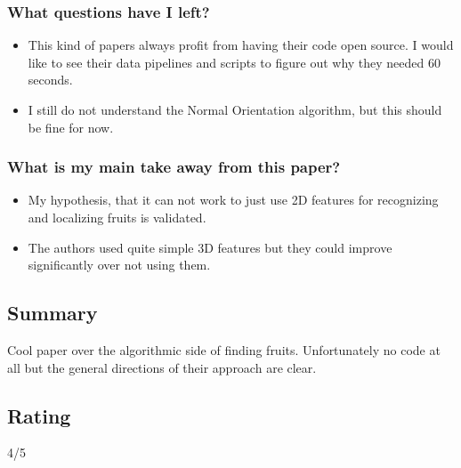     \subsubsection*{What questions have I left?}
    \begin{itemize}
        \item This kind of papers always profit from having their code open source. I would like to see their data pipelines and scripts to figure out why they needed 60 seconds.
        \item I still do not understand the Normal Orientation algorithm, but this should be fine for now.
    \end{itemize}
    \subsubsection*{What is my main take away from this paper?}
    \begin{itemize}
        \item My hypothesis, that it can not work to just use 2D features for recognizing and localizing fruits is validated.\
        \item The  authors used quite simple 3D features but they could improve significantly over not using them. 
    \end{itemize}
    
    \subsection*{Summary}
    Cool paper over the algorithmic side of finding fruits.  Unfortunately no code at all but the general directions of their approach are clear.
    
    \subsection*{Rating}
    4/5

